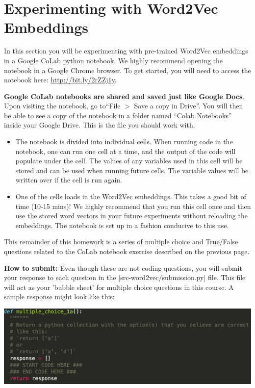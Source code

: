 \section{Experimenting with Word2Vec Embeddings}

In this section you will be experimenting with pre-trained Word2Vec embeddings in a Google CoLab python notebook. We highly recommend opening the notebook in a Google Chrome browser. To get started, you will need to access the notebook here: \url{http://bit.ly/2rZZj1y}.

\textbf{Google CoLab notebooks are shared and saved just like Google Docs}. Upon visiting the notebook, go to``File $>$ Save a copy in Drive''. You will then be able to see a copy of the notebook in a folder named “Colab Notebooks” inside your Google Drive. This is the file you should work with.

\begin{itemize}
    \item The notebook is divided into individual cells. When running code in the notebook, one can run one cell at a time, and the output of the code will populate under the cell. The values of any variables used in this cell will be stored and can be used when running future cells. The variable values will be written over if the cell is run again.  
    
    \item One of the cells loads in the Word2Vec embeddings. This takes a good bit of time (10-15 mins)! We highly recommend that you run this cell once and then use the stored word vectors in your future experiments without reloading the embeddings. The notebook is set up in a fashion conducive to this use.
\end{itemize}
\clearpage

This remainder of this homework is a series of multiple choice and True/False questions related to the CoLab notebook exercise described on the previous page.

{\bf How to submit:}  Even though these are not coding questions, you will submit your response to
each question in the |src-word2vec/submission.py| file.  This file will act as
your 'bubble sheet' for multiple choice questions in this course.  A sample response
might look like this:

\begin{center}
\includegraphics[width=1\textwidth]{sample_question_empty.png}
\end{center}

